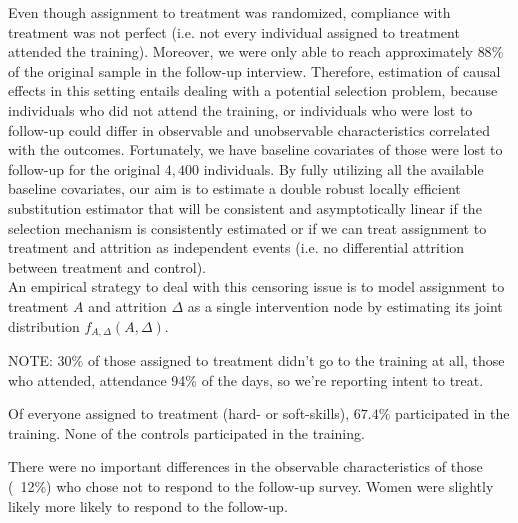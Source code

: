 Even though assignment to treatment was randomized, compliance with treatment was not perfect (i.e. not every individual assigned to treatment attended the training). Moreover, we were only able to reach approximately $88\%$ of the original sample in the follow-up interview. Therefore, estimation of causal effects in this setting entails dealing with a potential selection problem, because individuals who did not attend the training, or individuals who were lost to follow-up could differ in observable and unobservable characteristics correlated with the outcomes. Fortunately, we have baseline covariates of those were lost to follow-up for the original $4,400$ individuals. By fully utilizing all the available baseline covariates, our aim is to estimate a double robust locally efficient substitution estimator that will be consistent and asymptotically linear if the selection mechanism is consistently estimated or if we can treat assignment to treatment and attrition as independent events (i.e. no differential attrition between treatment and control).\\

An empirical strategy to deal with this censoring issue is to model assignment to treatment $A$ and attrition $\Delta$ as a single intervention node by estimating its joint distribution $f_{A,\Delta}(A,\Delta)$.



NOTE: 30\% of those assigned to treatment didn’t go to the training at all, those who attended, attendance 94\% of the days, so we’re reporting intent to treat.


 Of everyone assigned to treatment (hard- or soft-skills), $67.4\%$ participated in the training. None of the controls participated in the training.

There were no important differences in the observable characteristics of those (~12\%) who chose not to respond to the follow-up survey. Women were slightly likely more likely to respond to the follow-up.\\


